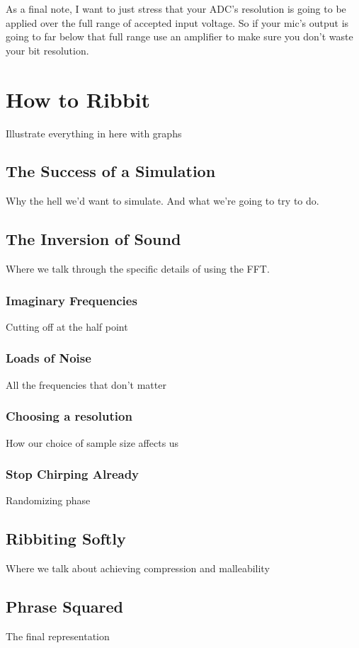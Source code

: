 \documentclass[10pt,a5paper]{book}
\begin{document}
As a final note, I want to just stress that your ADC's resolution is going to be applied over the full range of accepted input voltage. So if your mic's output is going to far below that full range use an amplifier to make sure you don't waste your bit resolution. 


\chapter{How to Ribbit}
Illustrate everything in here with graphs
\section{The Success of a Simulation}
Why the hell we'd want to simulate. And what we're going to try to do.
\section{The Inversion of Sound}
Where we talk through the specific details of using the FFT.
\subsection{Imaginary Frequencies}
Cutting off at the half point
\subsection{Loads of Noise}
All the frequencies that don't matter
\subsection{Choosing a resolution}
How our choice of sample size affects us
\subsection{Stop Chirping Already}
Randomizing phase
\section{Ribbiting Softly}
Where we talk about achieving compression and malleability
\section{Phrase Squared}
The final representation
\newpage



\end{document}
